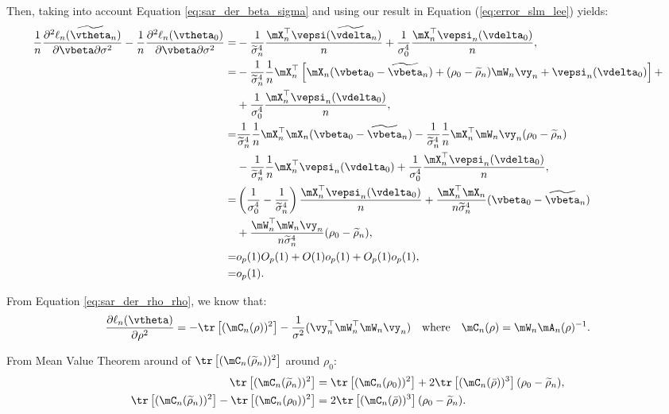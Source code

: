 \documentclass[english,12pt]{book}\usepackage[]{graphicx}\usepackage[]{xcolor}
\begin{document}
\begin{subappendices}
\begin{enumerate}
   Then, taking into account Equation \eqref{eq:sar_der_beta_sigma} and using our result in Equation (\ref{eq:error_slm_lee}) yields:
\begin{equation*}
    \begin{aligned}
    \frac{1}{n}\frac{\partial^2 \ell_n(\widetilde{\vtheta}_n)}{\partial \vbeta \partial \sigma^2} - \frac{1}{n}\frac{\partial^2 \ell_n(\vtheta_0)}{\partial \vbeta \partial \sigma^2}  = & - \frac{1}{\widetilde{\sigma}^4_n} \frac{\mX_n^\top \vepsi(\widetilde{\vdelta}_n)}{n}+  \frac{1}{\sigma^4_0} \frac{\mX^\top_n \vepsi_n(\vdelta_0)}{n}, \\
     = & - \frac{1}{\widetilde{\sigma}^4_n}\frac{1}{n}\mX_n^\top\left[\mX_n(\vbeta_0 - \widetilde{\vbeta}_n) + (\rho_0 - \widetilde{\rho}_n)\mW_n\vy_n + \vepsi_n(\vdelta_0) \right]+  \\
    & + \frac{1}{\sigma^4_0} \frac{\mX_n^\top \vepsi_n(\vdelta_0)}{n}, \\
   = & \frac{1}{\widetilde{\sigma}^4_n}\frac{1}{n}\mX_n^\top\mX_n(\vbeta_0 - \widetilde{\vbeta}_n) - \frac{1}{\widetilde{\sigma}^4_n}\frac{1}{n}\mX_n^\top\mW_n\vy_n(\rho_0 - \widetilde{\rho}_n)  \\
   & - \frac{1}{\widetilde{\sigma}^4_n}\frac{1}{n}\mX_n^\top \vepsi_n(\vdelta_0)  + \frac{1}{\sigma^4_0} \frac{\mX_n^\top \vepsi_n(\vdelta_0)}{n}, \\
   = & \left(\frac{1}{\sigma^4_0} - \frac{1}{\widetilde{\sigma}^4_n}\right)\frac{\mX^\top_n \vepsi_n(\vdelta_0)}{n} + \frac{\mX^\top_n\mX_n}{n\widetilde{\sigma}^4_n}(\vbeta_0 - \widetilde{\vbeta}_n)  \\
   & + \frac{\mW_n^\top\mW_n\vy_n}{n\widetilde{\sigma}^4_n}(\rho_0 - \widetilde{\rho}_n), \\
   = & o_p(1)O_p(1) + O(1)o_p(1) + O_p(1)o_p(1), \\
   = & o_p(1).
    \end{aligned}
   \end{equation*}
   
From Equation \eqref{eq:sar_der_rho_rho}, we know that:
   \begin{equation*}
   \frac{\partial \ell_n(\vtheta) }{\partial \rho ^2} = - \tr\left[(\mC_n(\rho))^2\right] - \frac{1}{\sigma^2}(\vy_n^{\top}\mW^{\top}_n\mW_n\vy_n)\quad \mbox{where}\quad \mC_n(\rho) = \mW_n\mA_n(\rho)^{-1}.
   \end{equation*}
   
   From Mean Value Theorem around of  $\tr\left[(\mC_n(\widetilde{\rho}_n))^2\right]$ around $\rho_0$:
   \begin{equation*}
    \begin{aligned}
    \tr\left[(\mC_n(\widetilde{\rho}_n))^2\right] & = \tr\left[(\mC_n(\rho_0))^2\right]+ 2\tr\left[(\mC_n(\bar{\rho}))^3\right](\rho_0 - \widetilde{\rho}_n), \\
    \tr\left[(\mC_n(\widetilde{\rho}_n))^2\right] - \tr\left[(\mC_n(\rho_0))^2\right] & = 2\tr\left[(\mC_n(\bar{\rho}))^3\right](\rho_0 - \widetilde{\rho}_n).
    \end{aligned}
   \end{equation*}
   

\end{enumerate}
\end{subappendices}
\end{document}
